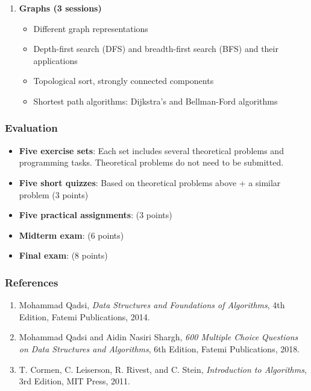\documentclass[12pt]{article}
\begin{document}
\begin{enumerate}
    \item \textbf{Graphs (3 sessions)}
        \begin{itemize}
            \item Different graph representations
            \item Depth-first search (DFS) and breadth-first search (BFS) and their applications
            \item Topological sort, strongly connected components
            \item Shortest path algorithms: Dijkstra’s and Bellman-Ford algorithms
        \end{itemize}
\end{enumerate}

\subsubsection*{Evaluation}
\begin{itemize}
    \item \textbf{Five exercise sets}: Each set includes several theoretical problems and programming tasks. Theoretical problems do not need to be submitted.
    \item \textbf{Five short quizzes}: Based on theoretical problems above + a similar problem (3 points)
    \item \textbf{Five practical assignments}: (3 points)
    \item \textbf{Midterm exam}: (6 points)
    \item \textbf{Final exam}: (8 points)
\end{itemize}

\subsubsection*{References}
\begin{enumerate}
    \item Mohammad Qadsi, \textit{Data Structures and Foundations of Algorithms}, 4th Edition, Fatemi Publications, 2014.
    \item Mohammad Qadsi and Aidin Nasiri Shargh, \textit{600 Multiple Choice Questions on Data Structures and Algorithms}, 6th Edition, Fatemi Publications, 2018.
    \item T. Cormen, C. Leiserson, R. Rivest, and C. Stein, \textit{Introduction to Algorithms}, 3rd Edition, MIT Press, 2011.
\end{enumerate}

\newpage
\end{document}
